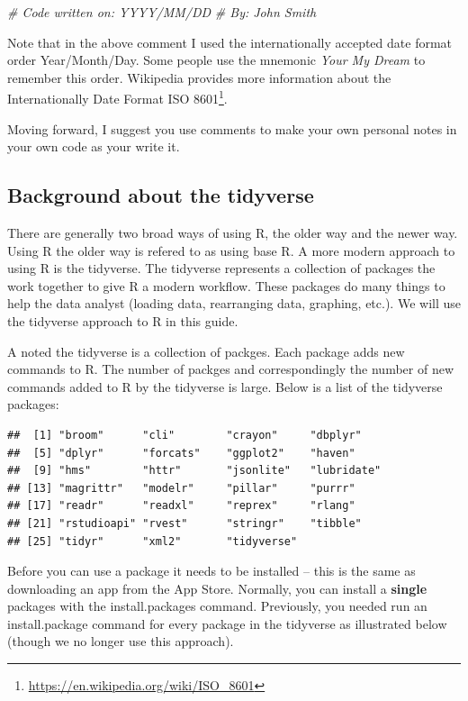 \documentclass[
]{krantz}
\makeatletter
\newenvironment{Shaded}{\begin{snugshade}}{\end{snugshade}}
\newcommand{\CommentTok}[1]{\textcolor[rgb]{0.37,0.37,0.37}{\textit{#1}}}
\renewcommand{\href}[2]{#2\footnote{\url{#1}}}
\newenvironment{kframe}{%
\medskip{}
\setlength{\fboxsep}{.8em}
 \def\at@end@of@kframe{}%
 \ifinner\ifhmode%
  \def\at@end@of@kframe{\end{minipage}}%
  \begin{minipage}{\columnwidth}%
 \fi\fi%
 \def\FrameCommand##1{\hskip\@totalleftmargin \hskip-\fboxsep
 \colorbox{shadecolor}{##1}\hskip-\fboxsep
     \hskip-\linewidth \hskip-\@totalleftmargin \hskip\columnwidth}%
 \MakeFramed {\advance\hsize-\width
   \@totalleftmargin\z@ \linewidth\hsize
   \@setminipage}}%
 {\par\unskip\endMakeFramed%
 \at@end@of@kframe}
\renewenvironment{Shaded}{\begin{kframe}}{\end{kframe}}
\makeatother
\begin{document}
\begin{Shaded}
\begin{Highlighting}[]
\CommentTok{# Code written on: YYYY/MM/DD }
\CommentTok{# By: John Smith}
\end{Highlighting}
\end{Shaded}

Note that in the above comment I used the internationally accepted date format order Year/Month/Day. Some people use the mnemonic \emph{Your My Dream} to remember this order. Wikipedia provides more information about the \href{https://en.wikipedia.org/wiki/ISO_8601}{Internationally Date Format ISO 8601}.

Moving forward, I suggest you use comments to make your own personal notes in your own code as your write it.

\hypertarget{background-about-the-tidyverse}{%
\subsection{Background about the tidyverse}\label{background-about-the-tidyverse}}

There are generally two broad ways of using R, the older way and the newer way. Using R the older way is refered to as using base R. A more modern approach to using R is the tidyverse. The tidyverse represents a collection of packages the work together to give R a modern workflow. These packages do many things to help the data analyst (loading data, rearranging data, graphing, etc.). We will use the tidyverse approach to R in this guide.

A noted the tidyverse is a collection of packges. Each package adds new commands to R. The number of packges and correspondingly the number of new commands added to R by the tidyverse is large. Below is a list of the tidyverse packages:

\begin{verbatim}
##  [1] "broom"      "cli"        "crayon"     "dbplyr"    
##  [5] "dplyr"      "forcats"    "ggplot2"    "haven"     
##  [9] "hms"        "httr"       "jsonlite"   "lubridate" 
## [13] "magrittr"   "modelr"     "pillar"     "purrr"     
## [17] "readr"      "readxl"     "reprex"     "rlang"     
## [21] "rstudioapi" "rvest"      "stringr"    "tibble"    
## [25] "tidyr"      "xml2"       "tidyverse"
\end{verbatim}

Before you can use a package it needs to be installed -- this is the same as downloading an app from the App Store. Normally, you can install a \textbf{single} packages with the install.packages command. Previously, you needed run an install.package command for every package in the tidyverse as illustrated below (though we no longer use this approach).
\end{document}
